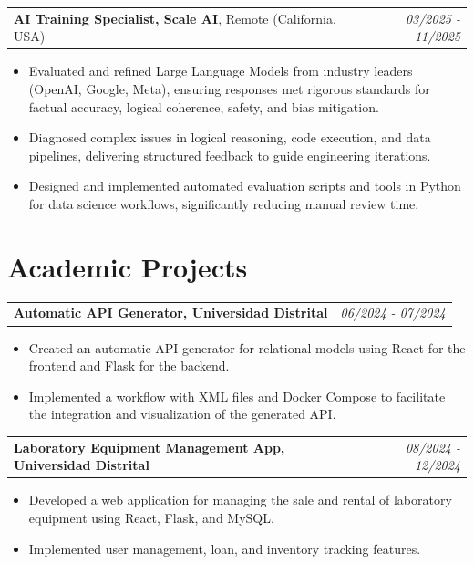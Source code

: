 \documentclass[letterpaper,12pt]{article}
\begin{document}
\noindent\begin{tabularx}{\textwidth}{Xr}
    \textbf{AI Training Specialist, Scale AI}, Remote (California, USA) & \textit{03/2025 - 11/2025} \\
\end{tabularx}
\begin{itemize}
    \item Evaluated and refined Large Language Models from industry leaders (OpenAI, Google, Meta), ensuring responses met rigorous standards for factual accuracy, logical coherence, safety, and bias mitigation.
    \item Diagnosed complex issues in logical reasoning, code execution, and data pipelines, delivering structured feedback to guide engineering iterations.
    \item Designed and implemented automated evaluation scripts and tools in Python for data science workflows, significantly reducing manual review time.
\end{itemize}

\section*{\textcolor{primary}{Academic Projects}}
\noindent\begin{tabularx}{\textwidth}{Xr}
    \textbf{Automatic API Generator, Universidad Distrital} & \textit{06/2024 - 07/2024} \\
\end{tabularx}
\begin{itemize}
    \item Created an automatic API generator for relational models using React for the frontend and Flask for the backend.
    \item Implemented a workflow with XML files and Docker Compose to facilitate the integration and visualization of the generated API.
\end{itemize}

\noindent\begin{tabularx}{\textwidth}{Xr}
    \textbf{Laboratory Equipment Management App, Universidad Distrital} & \textit{08/2024 - 12/2024} \\
\end{tabularx}
\begin{itemize}
    \item Developed a web application for managing the sale and rental of laboratory equipment using React, Flask, and MySQL.
    \item Implemented user management, loan, and inventory tracking features.
\end{itemize}
\end{document}

